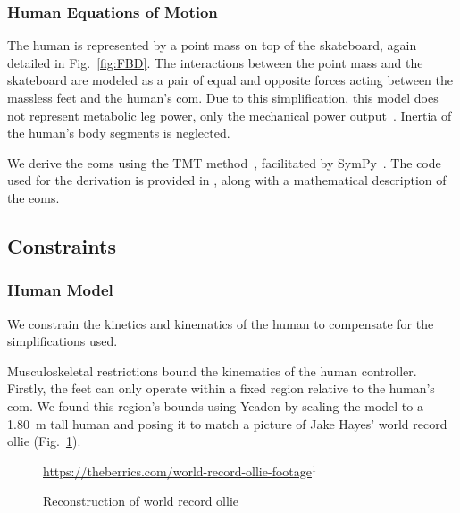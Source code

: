 \documentclass[default,iicol]{sn-jnl}
\begin{document}
\subsubsection{Human Equations of Motion}
The human is represented by a point mass on top of the skateboard, again detailed in Fig.~\ref{fig:FBD}.
The interactions between the point mass and the skateboard are modeled as a pair of equal and opposite forces acting between the massless feet and the human's \gls{com}.
Due to this simplification, this model does not represent metabolic leg power, only the mechanical power output~\cite{van_der_kruk_power_2018,morin_biomechanics_2018}. Inertia of the human's body segments is neglected.

We derive the \glspl{eom} using the TMT method~\cite{vallery_heike_advanced_2018}, facilitated by SymPy~\cite{meurer_sympy_2017}.
The code used for the derivation is provided in \cite{heinen_optimal_2022}, along with a mathematical description of the \glspl{eom}.

\subsection{Constraints}

\subsubsection{Human Model}

We constrain the kinetics and kinematics of the human to compensate for the simplifications used.

Musculoskeletal restrictions bound the kinematics of the human controller.
Firstly, the feet can only operate within a fixed region relative to the human's \gls{com}.
We found this region's bounds using Yeadon \cite{yeadon_simulation_1990} by scaling the model to a \SI{1.80}{\meter} tall human and posing it to match a picture of Jake Hayes' world record ollie (Fig.~\ref{fig:f_record}). 

\begin{figure}
    \centering
    \quad
    \caption{Reconstruction of world record ollie} 
    \label{fig:f_record}
    \centering \footnotesize \url{https://theberrics.com/world-record-ollie-footage}$^{1}$%
\end{figure}
\end{document}
